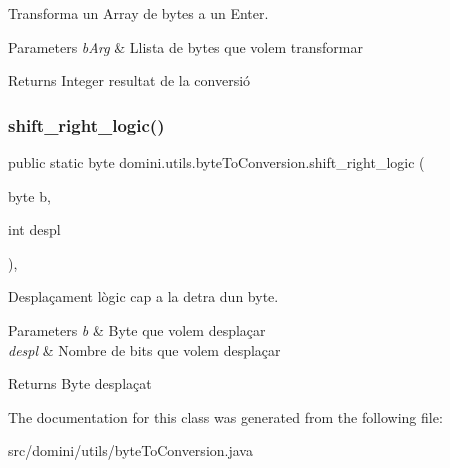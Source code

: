 Transforma un Array de bytes a un Enter. 


\begin{DoxyParams}{Parameters}
{\em b\+Arg} & Llista de bytes que volem transformar \\
\hline
\end{DoxyParams}
\begin{DoxyReturn}{Returns}
Integer resultat de la conversió 
\end{DoxyReturn}
\mbox{\label{classdomini_1_1utils_1_1byteToConversion_a0e232cb9d272ccc13accda58bab9f8e1}} 
\subsubsection{\texorpdfstring{shift\+\_\+right\+\_\+logic()}{shift\_right\_logic()}}
{\footnotesize\ttfamily public static byte domini.\+utils.\+byte\+To\+Conversion.\+shift\+\_\+right\+\_\+logic (\begin{DoxyParamCaption}\item[{byte}]{b,  }\item[{int}]{despl }\end{DoxyParamCaption})\hspace{0.3cm}{\ttfamily [inline]}, {\ttfamily [static]}}



Desplaçament lògic cap a la detra d\textquotesingle{}un byte. 


\begin{DoxyParams}{Parameters}
{\em b} & Byte que volem desplaçar \\
\hline
{\em despl} & Nombre de bits que volem desplaçar \\
\hline
\end{DoxyParams}
\begin{DoxyReturn}{Returns}
Byte desplaçat 
\end{DoxyReturn}


The documentation for this class was generated from the following file\+:\begin{DoxyCompactItemize}
\item 
src/domini/utils/byte\+To\+Conversion.\+java\end{DoxyCompactItemize}
